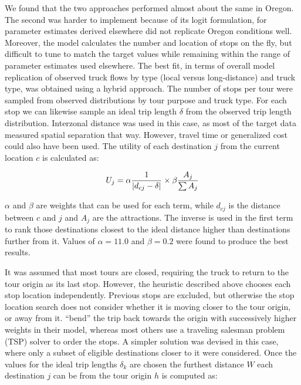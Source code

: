 We found that the two approaches performed almost about the same in Oregon. The second was harder to implement because of its logit formulation, for parameter estimates derived elsewhere did not replicate Oregon conditions well. Moreover, the model calculates the number and location of stops on the fly, but difficult to tune to match the target values while remaining within the range of parameter estimates used elsewhere. The best fit, in terms of overall model replication of observed truck flows by type (local versus long-distance) and truck type, was obtained using a hybrid approach. The number of stops per tour were sampled from observed distributions by tour purpose and truck type. For each stop we can likewise sample an ideal trip length $\delta$ from the observed trip length distribution. Interzonal distance was used in this case, as most of the target data measured spatial separation that way. However, travel time or generalized cost could also have been used. The utility of each destination $j$ from the current location $c$ is calculated as:

\begin{equation}
U_j = \alpha {1 \over {| d_{cj}-\delta} |} \times \beta {A_j \over \sum A_j}
\end{equation}

\noindent $\alpha$ and $\beta$ are weights that can be used for each term, while $d_{cj}$ is the distance between $c$ and $j$ and $A_j$ are the attractions. The inverse is used in the first term to rank those destinations closest to the ideal distance higher than destinations further from it. Values of $\alpha = 11.0$ and $\beta = 0.2$ were found to produce the best results. 

It was assumed that most tours are closed, requiring the truck to return to the tour origin as its last stop. However, the heuristic described above chooses each stop location independently. Previous stops are excluded, but otherwise the stop location search does not consider whether it is moving closer to the tour origin, or away from it. \cite{hunt07} ``bend'' the trip back towards the origin with successively higher weights in their model, whereas most others use a traveling salesman problem (TSP) solver to order the stops. A simpler solution was devised in this case, where only a subset of eligible destinations closer to it were considered. Once the values for the ideal trip lengths $\delta_k$ are chosen the furthest distance $W$ each destination $j$ can be from the tour origin $h$ is computed as:

